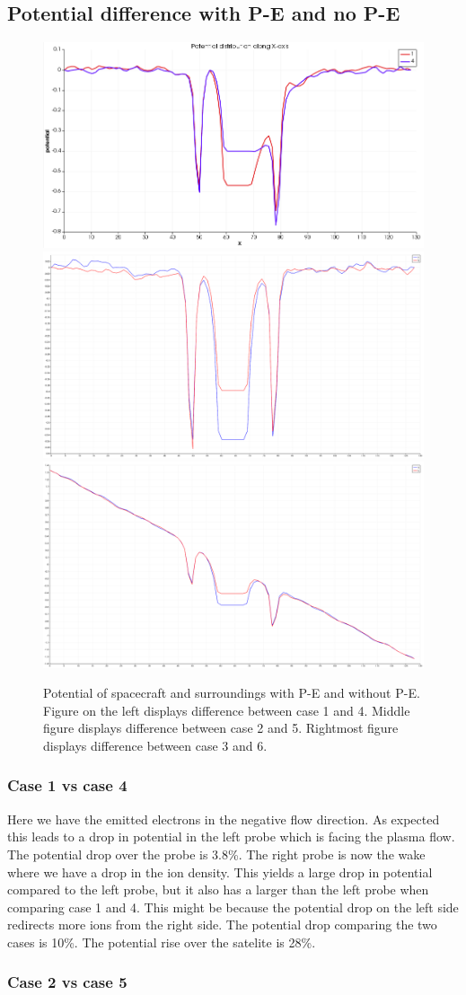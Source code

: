 \subsection{Potential difference with P-E and no P-E}

    \begin{figure}
        \includegraphics[width = 0.3 \textwidth]{potential_case1&4.png}
        \includegraphics[width = 0.3 \textwidth]{images/pot_case25.png}
        \includegraphics[width = 0.3 \textwidth]{images/pot_case36.png}
        \caption{Potential of spacecraft and surroundings with P-E and without P-E.
		Figure on the left displays difference between case 1 and 4. Middle figure
		displays difference between case 2 and 5. Rightmost figure displays difference between case 3 and 6.}
    \end{figure}


\subsubsection{Case 1 vs case 4}

Here we have the emitted electrons in the negative flow direction. As expected this
leads to a drop in potential in the left probe which is facing the plasma flow. The
potential drop over the probe is 3.8\%. The right probe is now the wake where we have
a drop in the ion density. This yields a large drop in potential compared to the left
probe, but it also has a larger than the left probe when comparing case 1 and 4. This
might be because the potential drop on the left side redirects more ions from the right side.
The potential drop comparing the two cases is 10\%. The potential rise over the satelite is 28\%.


\subsubsection{Case 2 vs case 5}

